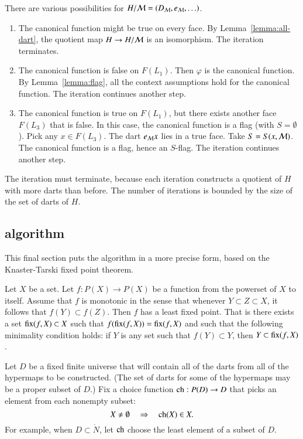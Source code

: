 There are various possibilities for $H/{\cal M} = (D_{\cal M},e_{\cal M},\ldots)$.
\begin{enumerate}
\item  The canonical function might be true on every face.  By Lemma~\ref{lemma:all-dart}, the quotient map $H\to H/{\cal M}$ is an isomorphism.  The iteration terminates.
\item The canonical function is false on $F(L_1)$.  Then $\varphi$ is the canonical function.  By Lemma~\ref{lemma:flag}, all the context assumptions hold for the canonical function.  The iteration continues another step.
\item The canonical function is true on $F(L_1)$, but there exists another face $F(L_3)$ that is false.  In this case, the canonical function is a flag (with $S=\emptyset$).  Pick any $x\in F(L_3)$.  The dart $e_{\cal M} x$ lies in a true face.  Take $S=S(x,{\cal M})$.  The canonical function is a flag, hence an $S$-flag.  The iteration continues another step.
\end{enumerate}

The iteration must terminate, because each iteration constructs a quotient of $H$ with more darts than before.  The number of iterations is bounded by the size of the set of darts of $H$.

\subsection{algorithm}

This final section puts the algorithm in a more precise form, based on the Knaster-Tarski fixed point theorem.

\begin{lemma}   Let $X$ be a set.  Let $f:P(X)\to P(X)$ be a function from the powerset of $X$ to itself.  Assume that $f$ is monotonic in the sense that whenever $Y\subset Z\subset X$, it follows that
$f(Y) \subset f(Z)$.  Then $f$ has a least fixed point.  That is there exists a set ${\operatorname{fix}}(f,X)\subset X$ such that $f({\operatorname{fix}}(f,X)) = {\operatorname{fix}}(f,X)$ and such that the following minimality condition holds: if $Y$ is any set such that $f(Y) \subset Y$, then $Y\subset {\operatorname{fix}}(f,X)$.
\end{lemma}

Let $D$ be a fixed finite universe that will contain all of the darts from all of the hypermaps to be constructed.   (The set of darts for some of the hypermaps may be a proper subset of $D$.) 
Fix a choice function ${\operatorname{ch}}:P(D)\to D$ that picks an element from each nonempty subset:
$$
X\ne\emptyset\quad  \Rightarrow \quad  {\operatorname{ch}}(X)\in X.
$$
For example, when $D\subset\ring{N}$, let ${\operatorname{ch}}$ choose the least element of a subset of $D$.

